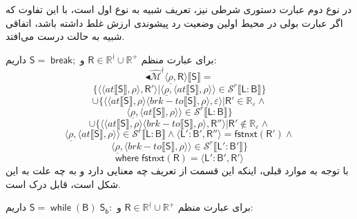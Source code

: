 در نوع دوم عبارت‌ دستوری شرطی نیز، تعریف شبیه به نوع اول است، با این تفاوت که اگر عبارت بولی در محیط اولین وضعیت رد پیشوندی ارزش غلط داشته باشد، اتفاقی شبیه به حالت درست می‌افتد.


 برای عبارت منظم 
 $\mathsf{R} \in \mathbb{R}^\nmid \cup \mathbb{R^+}$
 و 
 $\mathsf{S= \; break;}$
 داریم:
$$\blacktriangleleft \mathcal{\hat{M}^\nmid} \langle \underline{\rho}, \mathsf{R} \rangle 
\llbracket \mathsf{S} \rrbracket= $$
$$\{\langle \langle at \llbracket \mathsf{S} \rrbracket,\rho \rangle , \mathsf{R'} \rangle | \langle \underline{\rho} , \langle at \llbracket \mathsf{S} \rrbracket , \rho \rangle \rangle \in \mathcal{S}^r \llbracket \mathsf{L:B} \rrbracket\}$$
$$\cup \{ \langle \langle at \llbracket \mathsf{S} \rrbracket , \rho \rangle \langle brk-to \llbracket \mathsf{S} \rrbracket , \rho \rangle , \varepsilon \rangle | \mathsf{R'} \in \mathbb{R_\varepsilon} \land$$
$$\langle \underline{\rho}, \langle at \llbracket \mathsf{S} \rrbracket, \rho \rangle \rangle \in \mathcal{S}^r \llbracket \mathsf{L:B} \rrbracket \}$$
$$\cup \{ \langle \langle at \llbracket \mathsf{S} \rrbracket , \rho \rangle \langle brk-to \llbracket \mathsf{S} \rrbracket,\rho \rangle ,\mathsf{R''} \rangle | \mathsf{R'} \notin \mathbb{R_\varepsilon} \land$$
$$ \langle \underline{\rho},\langle at \llbracket \mathsf{S} \rrbracket , \rho \rangle \rangle \in \mathcal{S}^r \llbracket \mathsf{L:B} \rrbracket \land \langle \mathsf{L':B',R''} \rangle = \mathsf{fstnxt(R') \land}$$
$$\langle \underline{\rho}, \langle brk-to \llbracket \mathsf{S} \rrbracket, \rho \rangle \rangle \in \mathcal{S}^r \llbracket \mathsf{L':B'} \rrbracket \}$$
$$\mathsf{where\; fstnxt(R)=\langle L':B', R' \rangle}$$
 با توجه به موارد قبلی، اینکه این قسمت از تعریف چه معنایی دارد و به چه علت به این شکل است، قابل درک است.
 
 برای عبارت منظم 
 $\mathsf{R} \in \mathbb{R}^\nmid \cup \mathbb{R^+}$
 و 
 $\mathsf{S= \; while \; (B) \; S_b:}$
 داریم:
 

